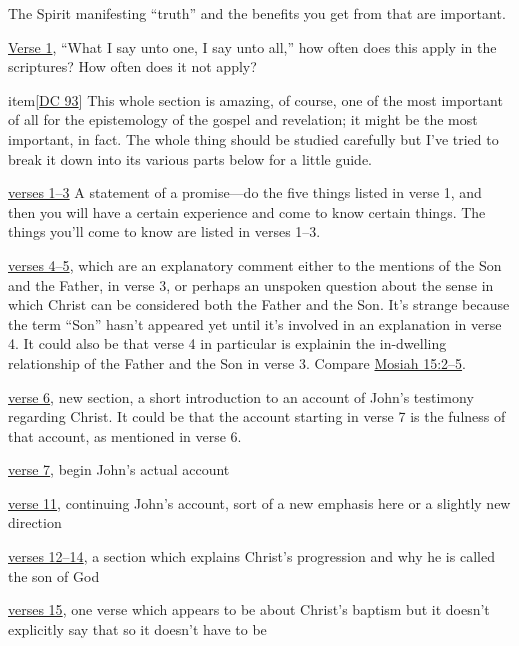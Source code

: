 \begin{compactdesc}
\begin{compactitem}
					\item The Spirit manifesting ``truth'' and the benefits you get from that are important.
				\end{compactitem}
			\item[{\hyperref[DC92]{DC 92}}]
				\begin{compactitem}
					\item \hyperref[DC92-1]{Verse 1}, ``What I say unto one, I say unto all,'' how often does this apply in the scriptures? How often does it not apply?
				\end{compactitem}
			item[{\hyperref[DC93]{DC 93}}] This whole section is amazing, of course, one of the most important of all for the epistemology of the gospel and revelation; it might be the most important, in fact. The whole thing should be studied carefully but I've tried to break it down into its various parts below for a little guide.
				\begin{compactitem}
					\item \hyperref[DC93-1]{verses 1--3} A statement of a promise---do the five things listed in verse 1, and then you will have a certain experience and come to know certain things. The things you'll come to know are listed in verses 1--3.
					\item \hyperref[DC93-4]{verses 4--5}, which are an explanatory comment either to the mentions of the Son and the Father, in verse 3, or perhaps an unspoken question about the sense in which Christ can be considered both the Father and the Son. It's strange because the term ``Son'' hasn't appeared yet until it's involved in an explanation in verse 4. It could also be that verse 4 in particular is explainin the in-dwelling relationship of the Father and the Son in verse 3. Compare \hyperref[MOSIAH-15-2]{Mosiah 15:2--5}.
					\item \hyperref[DC93-6]{verse 6}, new section, a short introduction to an account of John's testimony regarding Christ. It could be that the account starting in verse 7 is the fulness of that account, as mentioned in verse 6.
					\item \hyperref[DC93-7]{verse 7}, begin John's actual account
					\item \hyperref[DC93-11]{verse 11}, continuing John's account, sort of a new emphasis here or a slightly new direction
					\item \hyperref[DC93-12]{verses 12--14}, a section which explains Christ's progression and why he is called the son of God
					\item \hyperref[DC93-15]{verses 15}, one verse which appears to be about Christ's baptism but it doesn't explicitly say that so it doesn't have to be

\end{compactitem}
\end{compactdesc}
